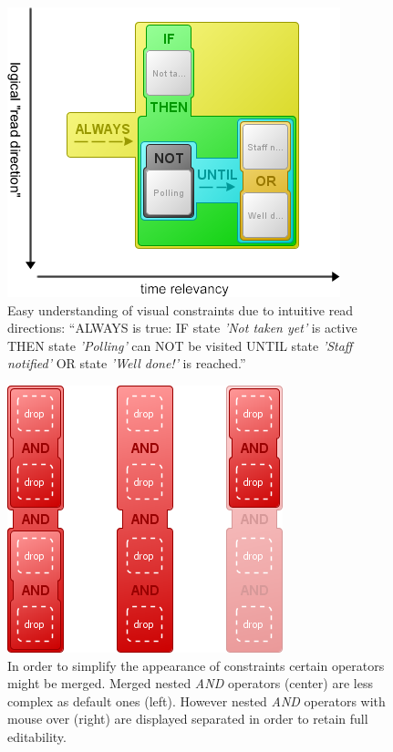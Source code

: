\documentclass[conference]{IEEEtran}
\begin{document}
\begin{figure}[htbp]
  \centering
  \includegraphics[scale=0.5]{directions}
  \caption{Easy understanding of visual constraints due to intuitive read directions: ``ALWAYS is true: IF state \emph{'Not taken yet'} is active THEN state \emph{'Polling'} can NOT be visited UNTIL state \emph{'Staff notified'} OR state \emph{'Well done!'} is reached.''}
  \label{fig:directions}
\end{figure}

\begin{figure}[htbp]
  \centering
  \includegraphics[scale=0.5]{and_simplify} %
  \caption{In order to simplify the appearance of constraints certain operators might be merged. Merged nested \emph{AND} operators (center) are less complex as default ones (left). However nested \emph{AND} operators with mouse over (right) are displayed separated in order to retain full editability.}
  \label{fig:nested_and}
\end{figure}
\end{document}
